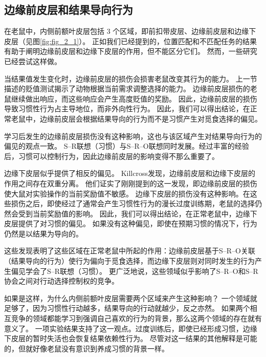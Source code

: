 \subsection{边缘前皮层和结果导向行为}

在老鼠中，内侧前额叶皮层包括 3 个区域，即前扣带皮层、边缘前皮层和边缘下皮层（见图\ref{fig:fig_2_1}）。
正如我们已经提到的，位置匹配和不匹配任务的结果有助于阐明边缘前皮层和边缘下皮层的作用，但不能区分它们。
然而，一些研究已经尝试这样做。\par


当结果值发生变化时，边缘前皮层的损伤会损害老鼠改变其行为的能力。
上一节描述的贬值测试揭示了动物根据当前需求调整选择的能力。
边缘前皮层损伤的老鼠继续做出响应，而这些响应会产生高度贬值的奖励。
因此，边缘前皮层的损伤导致习惯性行为占主导地位，而非外向性行为\cite{balleine1998goal,corbit2003role}。
因此，我们可以得出结论，在正常老鼠中，边缘前皮层会根据结果导向的行为而不是习惯产生对觅食选择的偏见。\par


学习后发生的边缘前皮层损伤没有这种影响\cite{ostlund2005lesions}，这也与该区域产生对结果导向行为的偏见的观点一致。
S–R联想（习惯）与S–R–O联想同时发展。经过丰富的经验后，习惯可以控制行为，因此边缘前皮层的影响变得不那么重要了。\par


边缘下皮层似乎提供了相反的偏见。
Killcross\cite{killcross2003coordination}发现，边缘前皮层和边缘下皮层的作用之间存在双重分离。
他们证实了刚刚提到的这一发现，即边缘前皮层的损伤使大鼠对实验操作的当前奖励值不敏感。
边缘下皮层的损伤没有这种影响。在这些损伤之后，即使经过了通常会产生习惯性行为的漫长过度训练期，老鼠的选择仍然会受到当前奖励值的影响。
因此，我们可以得出结论，在正常老鼠中，边缘下皮层提供了对习惯的偏见。
如果没有这种偏见，即使在预期习惯的情况下，行为仍然是以结果为导向的。\par


这些发现表明了这些区域在正常老鼠中所起的作用：边缘前皮层基于S–R–O关联（结果导向的行为）使行为偏向于觅食选择，而边缘下皮层则对同时发生的行为产生偏见学会了S–R联想（习惯）。
更广泛地说，这些领域似乎影响了S–R–O和S–R协会之间对行动选择控制权的竞争。\par


如果是这样，为什么内侧前额叶皮层需要两个区域来产生这种影响？
一个领域就足够了，因为习惯性行动越多，结果导向的行动就越少，反之亦然。
如果两个相互竞争的领域都能学习到强调自己喜欢的行为的背景，那么这两个领域的存在就有意义了。
一项实验结果支持了这一观点。过度训练后，即使已经形成习惯，边缘下皮层的暂时失活也会恢复结果依赖性行为\cite{coutureau2003inactivation}。
尽管对这一结果的其他解释是可能的，但就好像老鼠没有意识到养成习惯的背景一样。\par


